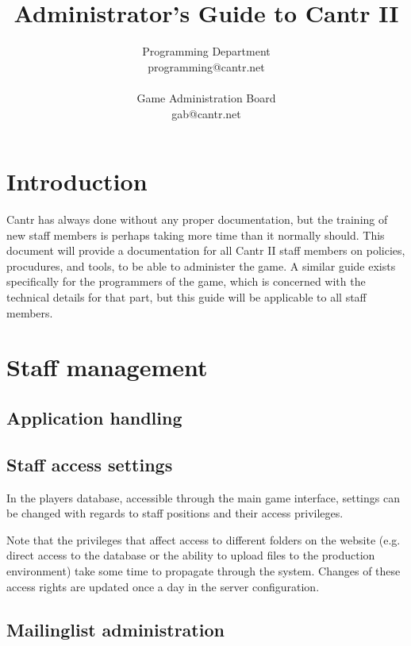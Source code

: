 \documentclass[a4paper,12pt]{article}
\begin{document}
\title{Administrator's Guide to Cantr II}
\author{Programming Department\\programming@cantr.net\\\\Game Administration Board\\gab@cantr.net}
\maketitle

\tableofcontents

\section{Introduction}

Cantr has always done without any proper documentation, but the training of new staff members is perhaps taking more time than it normally should. This document will provide a documentation for all Cantr II staff members on policies, procudures, and tools, to be able to administer the game. A similar guide exists specifically for the programmers of the game, which is concerned with the technical details for that part, but this guide will be applicable to all staff members.

\section{Staff management}

\subsection{Application handling}

\subsection{Staff access settings}

In the players database, accessible through the main game interface, settings can be changed with regards to staff positions and their access privileges.

Note that the privileges that affect access to different folders on the website (e.g. direct access to the database or the ability to upload files to the production environment) take some time to propagate through the system. Changes of these access rights are updated once a day in the server configuration.

\subsection{Mailinglist administration}
\end{document}
